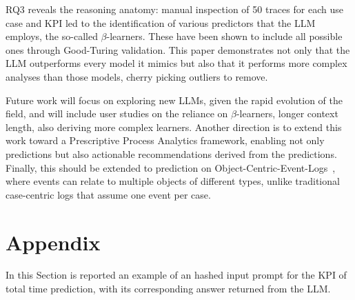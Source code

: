 \documentclass[manuscript,screen,review]{acmart}
\begin{document}
RQ3 reveals the reasoning anatomy: manual inspection of 50 traces for each use case and KPI led to the identification of various predictors that the LLM employs, the so-called $\beta$-learners. These have been shown to include all possible ones through Good-Turing validation. This paper demonstrates not only that the LLM outperforms every model it mimics but also that it performs more complex analyses than those models, cherry picking outliers to remove.

Future work will focus on exploring new LLMs, given the rapid evolution of the field, and will include user studies on the reliance on $\beta$-learners, longer context length, also deriving more complex learners. Another direction is to extend this work toward a Prescriptive Process Analytics framework, enabling not only predictions but also actionable recommendations derived from the predictions. Finally, this should be extended to prediction on Object-Centric-Event-Logs~\cite{DBLP:conf/adbis/GhahfarokhiPBA21,DBLP:conf/bpm/LeoniV25}, where events can relate to multiple objects of different types, unlike traditional case-centric logs that assume one event per case.








\newpage





\pagebreak

\pagebreak




\section*{Appendix}\label{sec:appendix}

In this Section is reported an example of an hashed input prompt for the KPI of total time prediction, with its corresponding answer returned from the LLM.


\end{document}
